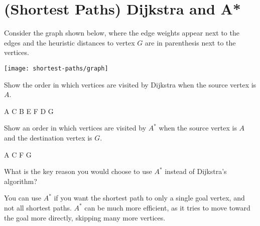 \section{(Shortest Paths) Dijkstra and A*}
\label{sec:examii-practice::shortest-paths-dijkstra-and-a}

\begin{cluster}
\label{grp:grm:examii-practice::fall}

\begin{gram}
\label{grm:examii-practice::fall}

\end{gram}
\end{cluster}

\begin{cluster}
\label{grp:prb:examii-practice::consider}

\begin{problem}[6]
\label{prb:examii-practice::consider}
Consider the graph shown below, where the edge weights appear next to
the edges and the heuristic distances to vertex $G$ are in parenthesis
next to the vertices.
\begin{center}
  \texttt{[image: shortest-paths/graph]}
\end{center}

\ask \label{prt-ask:examii-practice::show}

Show the order in which vertices are visited by Dijkstra when the source
vertex is $A$.

\sol \label{cki-sol:examii-practice::show}

A C B E F D G


\ask Show an order in which vertices are visited by $A^*$ when
the source vertex is $A$ and the destination vertex is $G$.


\sol \label{cki-sol:examii-practice::_3_}

A C F G 


\end{problem}
\end{cluster}

\begin{cluster}
\label{grp:prb:examii-practice::reason}

\begin{problem}[4]
\label{prb:examii-practice::reason}


\ask \label{prt-ask:examii-practice::reason}

What is the key reason you would choose to use $A^*$ instead of
Dijkstra's algorithm?


\sol \label{cki-sol:examii-practice::want}

You can use $A^*$ if you want the shortest path to only a single goal vertex,
and not all shortest paths. $A^*$ can be much more efficient, as it tries to
move toward the goal more directly, skipping many more vertices.

\end{problem}
\end{cluster}

